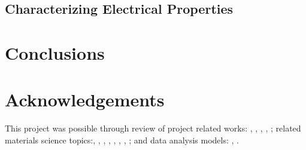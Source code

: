 \documentclass[12pt]{article}
\begin{document}
 





\pagebreak
\subsection{Characterizing Electrical Properties}

\section{Conclusions}






\section{Acknowledgements}
This project was possible through review of project related works: \cite{PaperMEMS}, \cite{DampingMech}, \cite{Particles1}, \cite{ReviewofTactileSensors}, \cite{D.ParameterModelforPZEBeam}; related materials science topics:\cite{Particles2}, \cite{Particles3}, \cite{Particles4}, \cite{Odd-EvenSAMS}, \cite{Particles5}, \cite{Particles6}, \cite{Particles7}, \cite{MicrofluidicChannels/Particles}; and data analysis models: \cite{MachineLearning1}, \cite{MachineLearning2}.







\newpage
\printbibliography[heading=subbibintoc]
%
%
\end{document}
